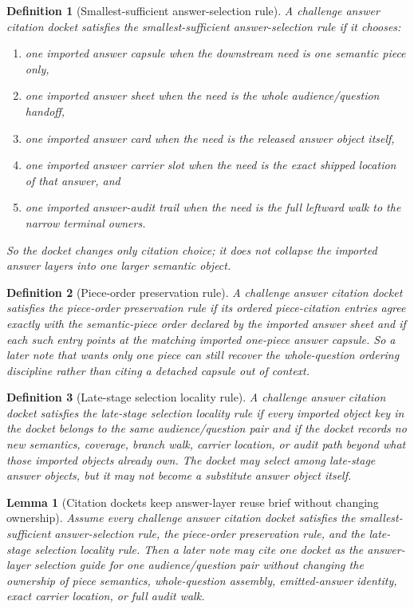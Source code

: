 \documentclass[11pt]{article}
\newtheorem{definition}{Definition}
\newtheorem{lemma}{Lemma}
\begin{document}
\begin{definition}[Smallest-sufficient answer-selection rule]
A challenge answer citation docket satisfies the \emph{smallest-sufficient answer-selection rule} if it chooses:
\begin{enumerate}[leftmargin=*]
\item one imported answer capsule when the downstream need is one semantic piece only,
\item one imported answer sheet when the need is the whole audience/question handoff,
\item one imported answer card when the need is the released answer object itself,
\item one imported answer carrier slot when the need is the exact shipped location of that answer, and
\item one imported answer-audit trail when the need is the full leftward walk to the narrow terminal owners.
\end{enumerate}
So the docket changes only citation choice; it does not collapse the imported answer layers into one larger semantic object.
\end{definition}

\begin{definition}[Piece-order preservation rule]
A challenge answer citation docket satisfies the \emph{piece-order preservation rule} if its ordered piece-citation entries agree exactly with the semantic-piece order declared by the imported answer sheet and if each such entry points at the matching imported one-piece answer capsule.
So a later note that wants only one piece can still recover the whole-question ordering discipline rather than citing a detached capsule out of context.
\end{definition}

\begin{definition}[Late-stage selection locality rule]
A challenge answer citation docket satisfies the \emph{late-stage selection locality rule} if every imported object key in the docket belongs to the same audience/question pair and if the docket records no new semantics, coverage, branch walk, carrier location, or audit path beyond what those imported objects already own.
The docket may select among late-stage answer objects, but it may not become a substitute answer object itself.
\end{definition}

\begin{lemma}[Citation dockets keep answer-layer reuse brief without changing ownership]
Assume every challenge answer citation docket satisfies the smallest-sufficient answer-selection rule, the piece-order preservation rule, and the late-stage selection locality rule.
Then a later note may cite one docket as the answer-layer selection guide for one audience/question pair without changing the ownership of piece semantics, whole-question assembly, emitted-answer identity, exact carrier location, or full audit walk.
\end{lemma}
\end{document}
